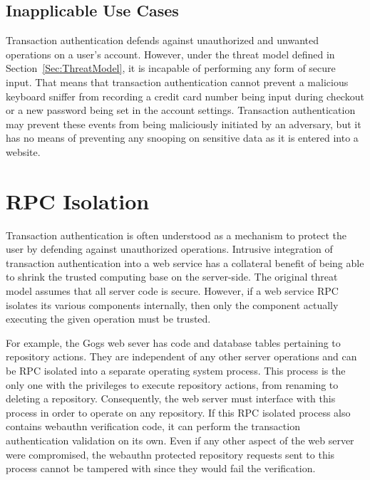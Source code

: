 
\subsection{Inapplicable Use Cases}

Transaction authentication defends against unauthorized and unwanted operations on a user's account. However, under the threat model defined in Section~\ref{Sec:ThreatModel}, it is incapable of performing any form of secure input. That means that transaction authentication cannot prevent a malicious keyboard sniffer from recording a credit card number being input during checkout or a new password being set in the account settings. Transaction authentication may prevent these events from being maliciously initiated by an adversary, but it has no means of preventing any snooping on sensitive data as it is entered into a website.

\section{RPC Isolation}

Transaction authentication is often understood as a mechanism to protect the user by defending against unauthorized operations. Intrusive integration of transaction authentication into a web service has a collateral benefit of being able to shrink the trusted computing base on the server-side. The original threat model assumes that all server code is secure. However, if a web service RPC isolates its various components internally, then only the component actually executing the given operation must be trusted. 

For example, the Gogs web sever has code and database tables pertaining to repository actions. They are independent of any other server operations and can be RPC isolated into a separate operating system process. This process is the only one with the privileges to execute repository actions, from renaming to deleting a repository. Consequently, the web server must interface with this process in order to operate on any repository. If this RPC isolated process also contains webauthn verification code, it can perform the transaction authentication validation on its own. Even if any other aspect of the web server were compromised, the webauthn protected repository requests sent to this process cannot be tampered with since they would fail the verification.


